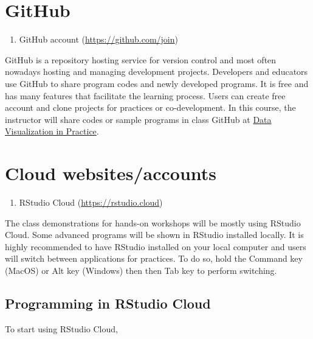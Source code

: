 \documentclass[
]{book}
\providecommand{\tightlist}{%
  \setlength{\itemsep}{0pt}\setlength{\parskip}{0pt}}
\begin{document}
\hypertarget{github}{%
\section{GitHub}\label{github}}

\begin{enumerate}
\def\labelenumi{\arabic{enumi}.}
\tightlist
\item
  GitHub account (\url{https://github.com/join})
\end{enumerate}

GitHub is a repository hosting service for version control and most often nowadays hosting and managing development projects. Developers and educators use GitHub to share program codes and newly developed programs. It is free and has many features that facilitate the learning process. Users can create free account and clone projects for practices or co-development. In this course, the instructor will share codes or sample programs in class GitHub at \href{https://www.github.com/datageneration/datavisualizationinpractice}{Data Visualization in Practice}.

\hypertarget{cloud-websitesaccounts}{%
\section{Cloud websites/accounts}\label{cloud-websitesaccounts}}

\begin{enumerate}
\def\labelenumi{\arabic{enumi}.}
\tightlist
\item
  RStudio Cloud (\url{https://rstudio.cloud})
\end{enumerate}

The class demonstrations for hands-on workshops will be mostly using RStudio Cloud. Some advanced programs will be shown in RStudio installed locally. It is highly recommended to have RStudio installed on your local computer and users will switch between applications for practices. To do so, hold the Command key (MacOS) or Alt key (Windows) then then Tab key to perform switching.

\hypertarget{programming-in-rstudio-cloud}{%
\subsection{Programming in RStudio Cloud}\label{programming-in-rstudio-cloud}}

To start using RStudio Cloud,
\end{document}
